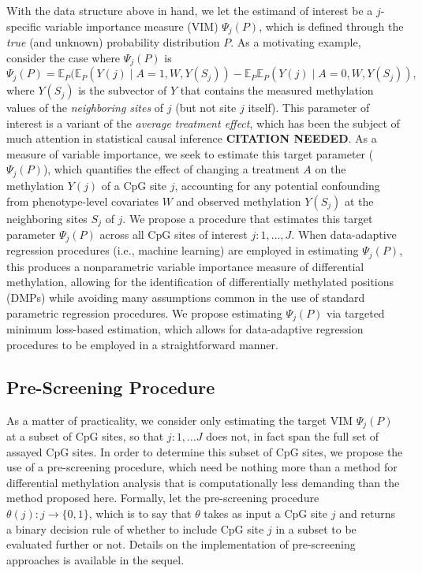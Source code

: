 \documentclass[9pt,a4paper,]{extarticle}
\theoremstyle{definition}
\theoremstyle{definition}
\theoremstyle{definition}
\theoremstyle{remark}
\begin{document}
With the data structure above in hand, we let the estimand of interest be a
\(j\)-specific variable importance measure (VIM) \(\Psi_j(P)\), which is defined
through the \emph{true} (and unknown) probability distribution \(P\). As a motivating
example, consider the case where \(\Psi_j(P)\) is
\begin{equation}\label{vim_param}
  \Psi_j(P) = \mathbb{E}_P(\mathbb{E}_P(Y(j) \mid A = 1, W, Y(S_j)) -
    \mathbb{E}_P \mathbb{E}_P(Y(j) \mid A = 0, W, Y(S_j)),
\end{equation}
where \(Y(S_j)\) is the subvector of \(Y\) that contains the measured methylation
values of the \emph{neighboring sites} of \(j\) (but not site \(j\) itself). This
parameter of interest is a variant of the \emph{average treatment effect}, which has
been the subject of much attention in statistical causal inference \textbf{CITATION
NEEDED}. As a measure of variable importance, we seek to estimate this target
parameter (\(\Psi_j(P)\)), which quantifies the effect of changing a treatment \(A\)
on the methylation \(Y(j)\) of a CpG site \(j\), accounting for any potential
confounding from phenotype-level covariates \(W\) and observed methylation
\(Y(S_j)\) at the neighboring sites \(S_j\) of \(j\). We propose a procedure that
estimates this target parameter \(\Psi_j(P)\) across all CpG sites of interest
\(j: 1, \ldots, J\). When data-adaptive regression procedures (i.e., machine
learning) are employed in estimating \(\Psi_j(P)\), this produces a nonparametric
variable importance measure of differential methylation, allowing for the
identification of differentially methylated positions (DMPs) while avoiding many
assumptions common in the use of standard parametric regression procedures. We
propose estimating \(\Psi_j(P)\) via targeted minimum loss-based estimation, which
allows for data-adaptive regression procedures to be employed in a
straightforward manner.

\hypertarget{pre-screening-procedure}{%
\subsection{Pre-Screening Procedure}\label{pre-screening-procedure}}

As a matter of practicality, we consider only estimating the target VIM
\(\Psi_j(P)\) at a subset of CpG sites, so that \(j: 1, \ldots J\) does not, in fact
span the full set of assayed CpG sites. In order to determine this subset of CpG
sites, we propose the use of a pre-screening procedure, which need be nothing
more than a method for differential methylation analysis that is computationally
less demanding than the method proposed here. Formally, let the pre-screening
procedure \(\theta(j): j \to \{0, 1\}\), which is to say that \(\theta\) takes as
input a CpG site \(j\) and returns a binary decision rule of whether to include
CpG site \(j\) in a subset to be evaluated further or not. Details on the
implementation of pre-screening approaches is available in the sequel.
\end{document}
